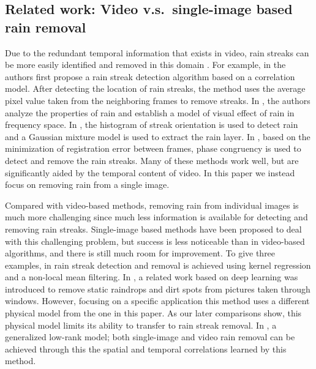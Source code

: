 \documentclass[journal]{IEEEtran}
\begin{document}
\subsection{Related work: Video v.s.\ single-image based rain removal}
Due to the redundant temporal information that exists in video, rain streaks can be more easily identified and removed in this domain \cite{1,5,6,10}. For example, in \cite{1} the authors first propose a rain streak detection algorithm based on a correlation model. After detecting the location of rain streaks, the method uses the average pixel value taken from the neighboring frames to remove streaks. In \cite{5}, the authors analyze the properties of rain and establish a model of visual effect of rain in frequency space. In \cite{6}, the histogram of streak orientation is used to detect rain and a Gaussian mixture model is used to extract the rain layer. In \cite{10}, based on the minimization of registration error between frames, phase congruency is used to detect and remove the rain streaks. Many of these methods work well, but are significantly aided by the temporal content of video. In this paper we instead focus on removing rain from a single image.

Compared with video-based methods, removing rain from individual images is much more challenging since much less information is available for detecting and removing rain streaks. Single-image based methods have been proposed to deal with this challenging problem, but success is less noticeable than in video-based algorithms, and there is still much room for improvement. To give three examples, in \cite{14} rain streak detection and removal is achieved using kernel regression and a non-local mean filtering. In  \cite{15}, a related work based on deep learning was introduced to remove static raindrops and dirt spots from pictures taken through windows. However, focusing on a specific application this method uses a different physical model from the one in this paper. As our later comparisons show, this physical model limits its ability to transfer to rain streak removal. In  \cite{36}, a generalized low-rank model; both single-image and video rain removal 
can be achieved through this the spatial and temporal correlations learned by this method.
\end{document}
